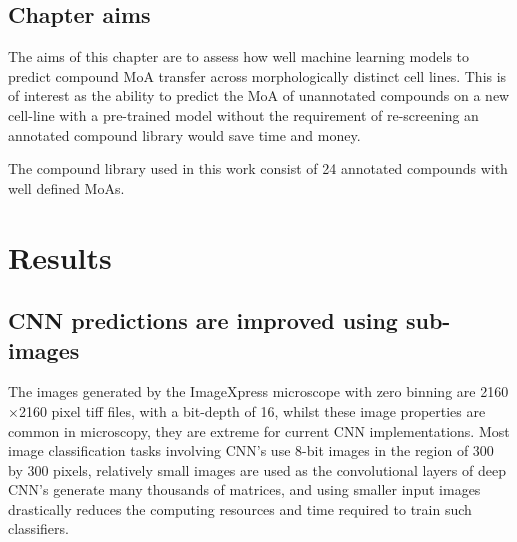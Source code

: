 \documentclass[a4paper,11pt,twoside,openright]{scrbook}
\begin{document}
\subsection{Chapter aims}
The aims of this chapter are to assess how well machine learning models to predict compound MoA transfer across morphologically distinct cell lines.
This is of interest as the ability to predict the MoA of unannotated compounds on a new cell-line with a pre-trained model without the requirement of re-screening an annotated compound library would save time and money.

The compound library used in this work consist of 24 annotated compounds with well defined MoAs.



\section{Results}

\subsection{CNN predictions are improved using sub-images}

The images generated by the ImageXpress microscope with zero binning are 2160$\times$2160 pixel tiff files, with a bit-depth of 16, whilst these image properties are common in microscopy, they are extreme for current CNN implementations.
Most image classification tasks involving CNN's use 8-bit images in the region of 300 by 300 pixels, relatively small images are used as the convolutional layers of deep CNN's generate many thousands of matrices, and using smaller input images drastically reduces the computing resources and time required to train such classifiers.
\end{document}
